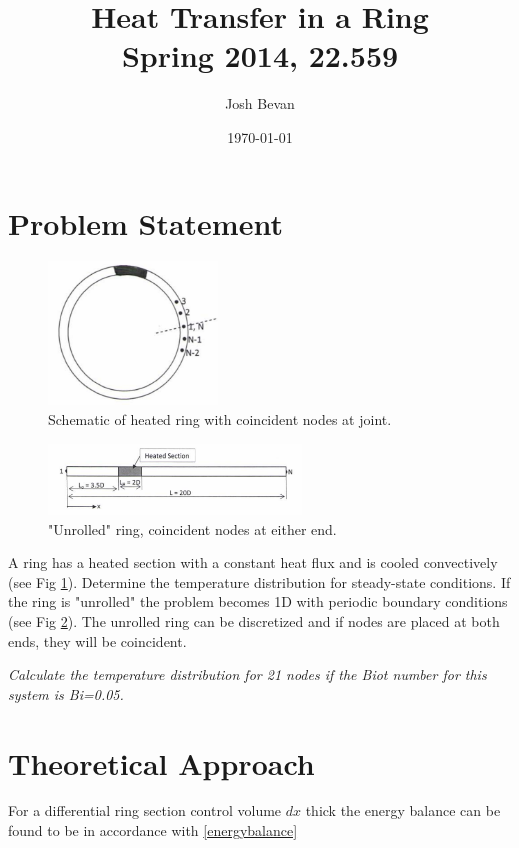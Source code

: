 \documentclass[letterpaper]{article}
\title{Heat Transfer in a Ring \\ Spring 2014, 22.559}
\author{Josh Bevan}
\date{\today}
\begin{document}
\maketitle

\section{Problem Statement}
\begin{figure}
\centering
\includegraphics[width=0.4\textwidth]{Ring.PNG}
\caption{\label{fig:ring}Schematic of heated ring with coincident nodes at joint.}
\end{figure}

\begin{figure}[!htb]
\centering
\includegraphics[width=0.6\textwidth]{Unrolled.PNG}
\caption{\label{fig:unrolled}"Unrolled" ring, coincident nodes at either end.}
\end{figure}

A ring has a heated section with a constant heat flux and is cooled convectively (see Fig \ref{fig:ring}). Determine the temperature distribution for steady-state conditions. If the ring is "unrolled" the problem becomes 1D with periodic boundary conditions (see Fig \ref{fig:unrolled}). The unrolled ring can be discretized and if nodes are placed at both ends, they will be coincident.

\textit{Calculate the temperature distribution for 21 nodes if the Biot number for this system is Bi=0.05.}

\section{Theoretical Approach}
For a differential ring section control volume \(dx\) thick the energy balance can be found to be in accordance with \eqref{energybalance}
\end{document}
